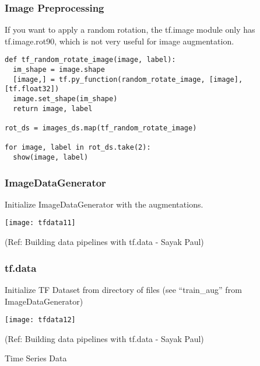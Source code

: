 \begin{frame}[fragile]\frametitle{Image Preprocessing}

If you want to apply a random rotation, the tf.image module only has tf.image.rot90, which is not very useful for image augmentation.

\begin{lstlisting}
def tf_random_rotate_image(image, label):
  im_shape = image.shape
  [image,] = tf.py_function(random_rotate_image, [image], [tf.float32])
  image.set_shape(im_shape)
  return image, label
	
rot_ds = images_ds.map(tf_random_rotate_image)

for image, label in rot_ds.take(2):
  show(image, label)
\end{lstlisting}
\end{frame}


\begin{frame}[fragile]\frametitle{ImageDataGenerator}

Initialize ImageDataGenerator with the augmentations.

\begin{center}
\texttt{[image: tfdata11]}

{\tiny (Ref: Building data pipelines with tf.data - Sayak Paul)}

\end{center}
\end{frame}

\begin{frame}[fragile]\frametitle{tf.data}

Initialize TF Dataset from directory of files (see ``train\_aug'' from ImageDataGenerator)

\begin{center}
\texttt{[image: tfdata12]}

{\tiny (Ref: Building data pipelines with tf.data - Sayak Paul)}

\end{center}
\end{frame}


\begin{frame}
  \begin{center}
    {\Large Time Series Data}
	
  \end{center}
\end{frame}

